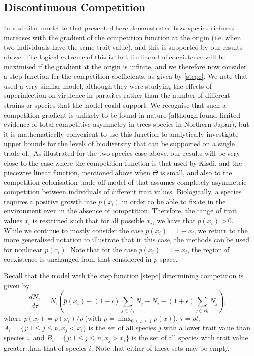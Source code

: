 \subsection{Discontinuous Competition}
\label{discontresults}
In a similar model to that presented here \cite{adler2000space} demonstrated how species richness increases with the gradient of the competition function at the origin (i.e. when two individuals have the same trait value), and this is supported by our results above. The logical extreme of this is that likelihood of coexistence will be maximised if the gradient at the origin is infinite, and we therefore now consider a step function for the competition coefficients, as given by \eqref{stepc}. We note that \cite{nowak1994superinfection} used a very similar model, although they were studying the effects of superinfection on virulence in parasites rather than the number of different strains or species that the model could support. We recognise that such a competition gradient is unlikely to be found in nature (although \cite{kubota1995tree} found limited evidence of total competitive asymmetry in trees species in Northern Japan), but it is mathematically convenient to use this function to analytically investigate upper bounds for the  levels of biodiversity that can be supported on a single trade-off. As illustrated for the two species case above, our results will be very close to the case where the competition function is that used by Kisdi, and the piecewise linear function, mentioned above when $\Theta$ is small, and also to the competition-colonisation trade-off model of \cite{tilman1994competition} that assumes completely asymmetric competition between individuals of different trait values. Biologically, a species requires a positive growth rate $p(x_i)$ in order to be able to fixate in the environment even in the absence of competition. Therefore,  the range of trait values $x_i$ is restricted such that for all possible $x_i$, we have that $p(x_i)>0$. While we continue to mostly consider the case $p(x_i)=1-x_i$, we return to the more generalised notation to illustrate that in this case, the methods can be used for nonlinear $p(x_i)$. Note that for the case $p(x_i)=1-x_i$, the region of coexistence is unchanged from that considered in $p$-space.

Recall that the model with the step function \eqref{stepc} determining competition is given by
\begin{equation}
\label{rescaledmodel}
\frac{d N_i}{d\tau}=N_i\left(\bar{p}(x_i)-(1-\epsilon)\sum_{j\in A_i}N_j-N_i-(1+\epsilon)\sum_{j\in B_i}N_j\right),
\end{equation}
where $\bar{p}(x_i)=p(x_i)/\rho$ (with $\rho=\max_{0\leq x\leq 1} p(x)$), $\tau=\rho t$, $A_i=\{j:1\leq j\leq n,x_j<x_i\}$ is the set of all species $j$ with a lower trait value than species $i$, and $B_i=\{j:1\leq j\leq n,x_j>x_i\}$ is the set of all species with trait value greater than that of species $i$. Note that either of these sets may be empty. 

